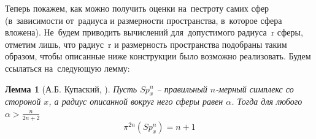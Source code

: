 \documentclass{report}%
\newtheorem{lemma}{Лемма}
\begin{document}
\noindent Теперь покажем, как можно получить оценки на~пестроту самих сфер (в~зависимости от~радиуса и размерности пространства, в~которое сфера вложена). Не~будем приводить вычислений для~допустимого радиуса~r сферы, отметим лишь, что радиус~r и размерность пространства подобраны таким образом, чтобы описанные ниже конструкции было возможно реализовать. Будем ссылаться на~следующую лемму:

\begin{lemma}[А.Б. Купаский, \cite{Kupavsky2011}]
		Пусть $Sp_x^n$ – правильный $n$-мерный симплекс со стороной $x$,
		а радиус описанной вокруг него сферы равен $\alpha$. Тогда для любого $\alpha > \frac{n}{2n + 2}$
		\begin{equation}
				\pi^{2n}(Sp_x^n) = n+1
		\end{equation}
\end{lemma}
\end{document}
